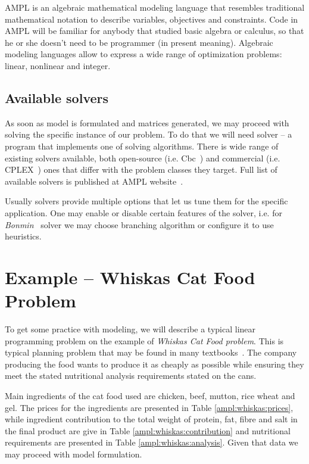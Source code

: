 AMPL is an algebraic mathematical modeling language that resembles traditional mathematical notation to describe variables, objectives and constraints. Code in AMPL will be familiar for anybody that studied basic algebra or calculus, so that he or she doesn't need to be programmer (in present meaning). Algebraic modeling languages allow to express a wide range of optimization problems: linear, nonlinear and integer.

\subsection{Available solvers}

As soon as model is formulated and matrices generated, we may proceed with solving the specific instance of our problem. To do that we will need solver -- a program that implements one of solving algorithms. There is wide range of existing solvers available, both open-source (i.e. Cbc~\cite{cbc-solver}) and commercial (i.e. CPLEX~\cite{cplex}) ones that differ with the problem classes they target. Full list of available solvers is published at AMPL website~\cite{AMPLSolvers}.

Usually solvers provide multiple options that let us tune them for the specific application. One may enable or disable certain features of the solver, i.e. for \emph{Bonmin}~\cite{Bonmin} solver we may choose branching algorithm or configure it to use heuristics.

\section{Example -- Whiskas Cat Food Problem}
\label{sec:ampl:whiskas}

To get some practice with modeling, we will describe a typical linear programming problem on the example of \emph{Whiskas Cat Food problem}. This is typical planning problem that may be found in many textbooks~\cite{dantzig}. The company producing the food wants to produce it as cheaply as possible while ensuring they meet the stated nutritional analysis requirements stated on the cans. 

Main ingredients of the cat food used are chicken, beef, mutton, rice wheat and gel. The prices for the ingredients are presented in Table \ref{ampl:whiskas:prices}, while ingredient contribution to the total weight of protein, fat, fibre and salt in the final product are give in Table \ref{ampl:whiskas:contribution} and nutritional requirements are presented in Table \ref{ampl:whiskas:analysis}. Given that data we may proceed with model formulation.

